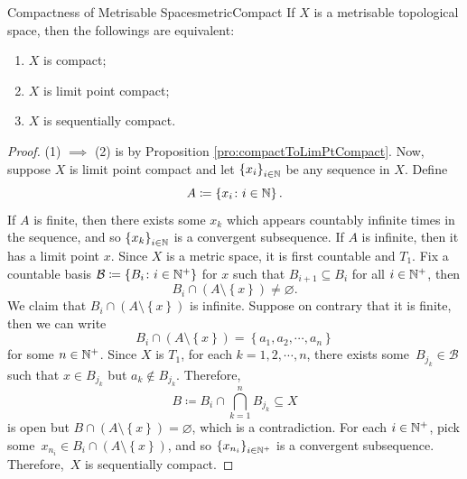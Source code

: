 \documentclass[math]{amznotes}
\theoremstyle{remark}
\begin{document}
\begin{probox}{Compactness of Metrisable Spaces}{metricCompact}
    If $X$ is a metrisable topological space, then the followings are equivalent:
    \begin{enumerate}
        \item $X$ is compact;
        \item $X$ is limit point compact;
        \item $X$ is sequentially compact.
    \end{enumerate}
    \tcblower
    \begin{proof}
        (1) $\implies$ (2) is by Proposition \ref{pro:compactToLimPtCompact}. Now, suppose $X$ is limit point compact and let $\left\{x_i\right\}_{i \in \mathbb{N}}$ be any sequence in $X$. Define 
        \begin{equation*}
            A \coloneqq \left\{x_i \colon i \in \mathbb{N}\right\}.
        \end{equation*}
        If $A$ is finite, then there exists some $x_k$ which appears countably infinite times in the sequence, and so $\left\{x_k\right\}_{i \in \mathbb{N}}$ is a convergent subsequence. If $A$ is infinite, then it has a limit point $x$. Since $X$ is a metric space, it is first countable and $T_1$. Fix a countable basis $\mathcal{B} \coloneqq \left\{B_i \colon i \in \mathbb{N}^+\right\}$ for $x$ such that $B_{i + 1} \subseteq B_i$ for all $i \in \mathbb{N}^+$, then 
        \begin{equation*}
            B_i \cap \left(A \setminus \left\{x\right\}\right) \neq \varnothing.
        \end{equation*}
        We claim that $B_i \cap \left(A \setminus \left\{x\right\}\right)$ is infinite. Suppose on contrary that it is finite, then we can write 
        \begin{equation*}
            B_i \cap \left(A \setminus \left\{x\right\}\right) = \left\{a_1, a_2, \cdots, a_n\right\}
        \end{equation*}
        for some $n \in \mathbb{N}^+$. Since $X$ is $T_1$, for each $k = 1, 2, \cdots, n$, there exists some~$B_{j_k} \in \mathcal{B}$ such that $x \in B_{j_k}$ but $a_k \notin B_{j_k}$. Therefore, 
        \begin{equation*}
            B \coloneqq B_i \cap \bigcap_{k = 1}^nB_{j_k} \subseteq X
        \end{equation*}
        is open but $B \cap \left(A \setminus \left\{x\right\}\right) = \varnothing$, which is a contradiction. For each $i \in \mathbb{N}^+$, pick some~$x_{n_i} \in B_i \cap \left(A \setminus \left\{x\right\}\right)$, and so $\left\{x_{n_i}\right\}_{i \in \mathbb{N}^+}$ is a convergent subsequence. Therefore,~$X$ is sequentially compact.

\end{proof}
\end{probox}
\end{document}
